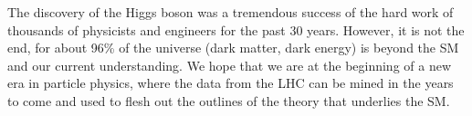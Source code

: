 The discovery of the Higgs boson was a tremendous success of the hard work of thousands of physicists and engineers for the past 30 years. 
However, it is not the end, for about 96\% of 
the universe (dark matter, dark energy) is beyond the SM and our current understanding. 
We hope that we are at the beginning of a new era in particle physics, where the data from the LHC can be mined in the years to come and used to flesh out the outlines of the theory that underlies the SM.


 

